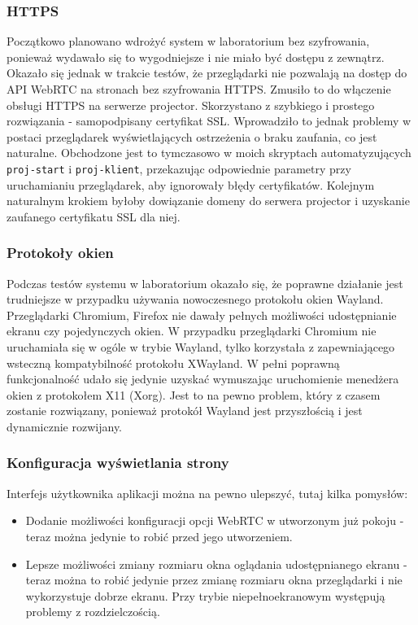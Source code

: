 \documentclass[a4paper,11pt]{article}
\begin{document}
            \subsubsection{HTTPS}
            Początkowo planowano wdrożyć system w laboratorium bez szyfrowania, ponieważ wydawało się to wygodniejsze i nie miało być dostępu z zewnątrz.
            Okazało się jednak w trakcie testów, że przeglądarki nie pozwalają na dostęp do API WebRTC na stronach bez szyfrowania HTTPS.
            Zmusiło to do włączenie obsługi HTTPS na serwerze projector. Skorzystano z szybkiego i prostego rozwiązania - samopodpisany certyfikat SSL.
            Wprowadziło to jednak problemy w postaci przeglądarek wyświetlających ostrzeżenia o braku zaufania, co jest naturalne. 
            Obchodzone jest to tymczasowo w moich skryptach automatyzujących \texttt{proj-start} i \texttt{proj-klient}, przekazując odpowiednie parametry przy uruchamianiu przeglądarek, aby ignorowały błędy certyfikatów.
            Kolejnym naturalnym krokiem byłoby dowiązanie domeny do serwera projector i uzyskanie zaufanego certyfikatu SSL dla niej. 
            \subsubsection{Protokoły okien}
            Podczas testów systemu w laboratorium okazało się, że poprawne działanie jest trudniejsze w przypadku używania nowoczesnego protokołu okien Wayland.
            Przeglądarki Chromium, Firefox nie dawały pełnych możliwości udostępnianie ekranu czy pojedynczych okien. 
            W przypadku przeglądarki Chromium nie uruchamiała się w ogóle w trybie Wayland, tylko korzystała z zapewniającego wsteczną kompatybilność protokołu XWayland.
            W pełni poprawną funkcjonalność udało się jedynie uzyskać wymuszając uruchomienie menedżera okien z protokołem X11 (Xorg).
            Jest to na pewno problem, który z czasem zostanie rozwiązany, ponieważ protokół Wayland jest przyszłością i jest dynamicznie rozwijany.
            \subsubsection{Konfiguracja wyświetlania strony}
            Interfejs użytkownika aplikacji można na pewno ulepszyć, tutaj kilka pomysłów: 
            \begin{itemize}
            \item Dodanie możliwości konfiguracji opcji WebRTC w utworzonym już pokoju - teraz można jedynie to robić przed jego utworzeniem.
            \item Lepsze możliwości zmiany rozmiaru okna oglądania udostępnianego ekranu - teraz można to robić jedynie przez zmianę rozmiaru okna przeglądarki i nie wykorzystuje dobrze ekranu.
            Przy trybie niepełnoekranowym występują problemy z rozdzielczością.
            \end{itemize}
\end{document}
